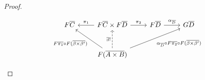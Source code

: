 \documentclass[runningheads]{llncs}
\begin{document}
\begin{proof}
\begin{figure*}[ht]
\begin{minipage}[b]{0.25\linewidth}
{\[\begin{tikzcd}[row sep = large]
          F\overline{C}
          &F\overline{C} \times F\overline{D}
          \ar[l, "{\pi_1}"'] \ar[r, "{\pi_2}"]
          &F\overline{D}
          \ar[r, "{\alpha_{\ol{D}}}"]
          &G\overline{D}\\
          &F(\overline{A \times B})
          \ar[u, dashed, "{\exists !}"]
          \ar[ul, "{F\ol{\pi_1} \circ F(\overline{\beta \times \beta'})}"]
          \ar[urr, "{\alpha_{\ol{D}} \circ F\ol{\pi_2} \circ F(\overline{\beta \times \beta'})}"']
      \end{tikzcd}
      \]}
\end{minipage}
\end{figure*}


\end{proof}
\end{document}

